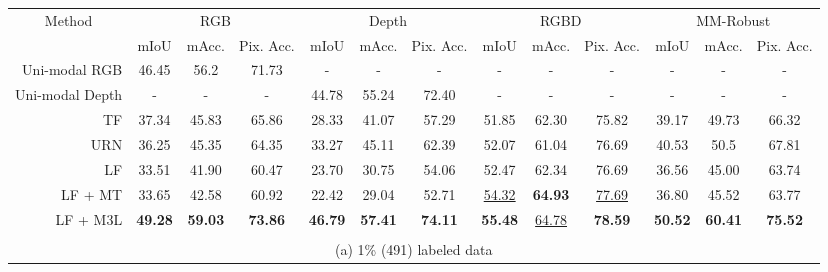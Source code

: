 \documentclass[10pt,twocolumn,letterpaper]{article}
\begin{document}
\begin{table*}[h]
{\begin{tabular}{rccc|ccc|ccc|ccc}
\toprule
\multicolumn{1}{c}{\multirow{2}{*}{Method}} & \multicolumn{3}{c|}{RGB} & \multicolumn{3}{c|}{Depth} & \multicolumn{3}{c|}{RGBD} & \multicolumn{3}{c}{MM-Robust} \\
\multicolumn{1}{c}{} & mIoU & mAcc. & Pix. Acc. & mIoU & mAcc. & Pix. Acc. & mIoU & mAcc. & Pix. Acc. & mIoU & mAcc. & Pix. Acc. \\ \midrule
Uni-modal RGB & 46.45 & 56.2 & 71.73 & - & - & - & - & - & - & - & - & - \\
Uni-modal Depth & - & - & - & 44.78 & 55.24 & 72.40 & - & - & - & - & - & - \\
TF \cite{tokenfusion}& 37.34 & 45.83 & 65.86 & 28.33 & 41.07 & 57.29 & 51.85 & 62.30 & 75.82 & 39.17 & 49.73 & 66.32 \\
URN \cite{urn}& 36.25 & 45.35 & 64.35 & 33.27 & 45.11 & 62.39 & 52.07 & 61.04 & 76.69 & 40.53 & 50.5 & 67.81 \\
LF & 33.51 & 41.90 & 60.47 & 23.70 & 30.75 & 54.06 & 52.47 & 62.34 & 76.69 & 36.56 & 45.00 & 63.74 \\ \midrule
LF + MT & 33.65 & 42.58 & 60.92 & 22.42 & 29.04 & 52.71 & \underline{54.32} & \textbf{64.93} & \underline{77.69} & 36.80 & 45.52 & 63.77 \\
LF + M3L & \textbf{49.28} & \textbf{59.03} & \textbf{73.86} & \textbf{46.79} & \textbf{57.41} & \textbf{74.11} & \textbf{55.48} & \underline{64.78} & \textbf{78.59} & \textbf{50.52} & \textbf{60.41} & \textbf{75.52} \\ \bottomrule


\multicolumn{13}{c}{\vspace{0.1cm}}\\
\multicolumn{13}{c}{(a) 1\% (491) labeled data}\\


\end{tabular}}
\end{table*}
\end{document}
